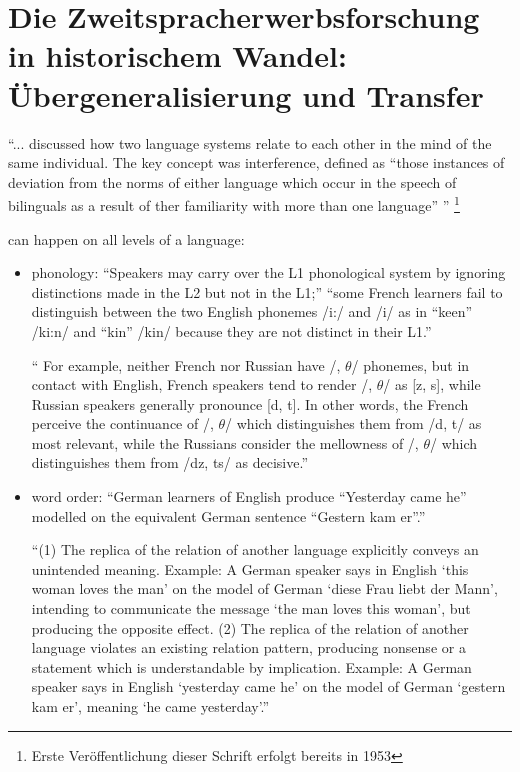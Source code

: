 \section{Die Zweitspracherwerbsforschung in historischem Wandel: Übergeneralisierung und Transfer}


\cite{Weinreich79} ``... discussed how two language systems relate to each other in the mind of the same individual.
The key concept was interference, defined as ``those instances of deviation from the norms of either language which occur in the speech of bilinguals as a result of ther familiarity with more than one language'' \cite{Weinreich79} '' \cite{Cook93}
\footnote{Erste Veröffentlichung dieser Schrift erfolgt bereits in 1953}

can happen on all levels of a language:
\begin{itemize}
    \item phonology: ``Speakers may carry over the L1 phonological system by ignoring distinctions made in the L2 but not in the L1;'' \cite{Cook93}
        ``some French learners fail to distinguish between the two English phonemes /i:/ and /i/ as in ``keen'' /ki:n/ and ``kin'' /kin/ because they are not distinct in their L1.''

        \cite{Weinreich79} `` For example, neither French nor Russian have /, $\theta$/ phonemes, but in contact
        with English, French speakers tend to render /, $\theta$/ as [z, s], while Russian
        speakers generally pronounce [d, t].
        In other words, the French perceive the continuance of /, $\theta$/ which distinguishes them from /d, t/ as most relevant, while
        the Russians consider the mellowness of /, $\theta$/ which distinguishes them from /dz, ts/ as decisive.''


    \item word order: ``German learners of English produce ``Yesterday came he'' modelled on the equivalent German sentence ``Gestern kam er''.''

        \cite{Weinreich79} ``(1) The replica of the relation of another language explicitly conveys an unintended meaning.
        Example: A German speaker says in English `this woman loves the man' on the model of German
        `diese Frau liebt der Mann', intending to communicate the message `the man
        loves this woman', but producing the opposite effect.
        (2) The replica of the relation of another language violates an existing relation pattern, producing
        nonsense or a statement which is understandable by implication.
        Example: A German speaker says in English `yesterday came he' on the model of German
        `gestern kam er', meaning `he came yesterday'.''


\end{itemize}

